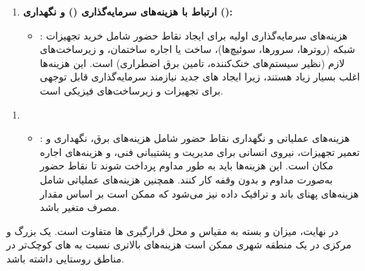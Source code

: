\begin{enumerate}
\begin{qsolve}
\begin{enumerate}
			\item 
			\textbf{ارتباط  با هزینه‌های سرمایه‌گذاری () و نگهداری ():}
			\begin{itemize}
				\item 
				: هزینه‌های سرمایه‌گذاری اولیه برای ایجاد نقاط حضور شامل خرید تجهیزات شبکه (روترها، سرورها، سوئیچ‌ها)، ساخت یا اجاره ساختمان، و زیرساخت‌های لازم (نظیر سیستم‌های خنک‌کننده، تامین برق اضطراری) است. این هزینه‌ها اغلب بسیار زیاد هستند، زیرا ایجاد های جدید نیازمند سرمایه‌گذاری قابل توجهی برای تجهیزات و زیرساخت‌های فیزیکی است.
			\end{itemize}

		\end{enumerate}
	\end{qsolve}
	
	
	
	\begin{qsolve}
		\begin{enumerate}
			\item [ ]
			\begin{itemize}
				\item 
				: هزینه‌های عملیاتی و نگهداری نقاط حضور شامل هزینه‌های برق، نگهداری و تعمیر تجهیزات، نیروی انسانی برای مدیریت و پشتیبانی فنی، و هزینه‌های اجاره مکان است. این هزینه‌ها باید به طور مداوم پرداخت شوند تا نقاط حضور به‌صورت مداوم و بدون وقفه کار کنند. همچنین هزینه‌های عملیاتی شامل هزینه‌های پهنای باند و ترافیک داده نیز می‌شود که ممکن است بر اساس مقدار مصرف متغیر باشد.
			\end{itemize}
			
		\end{enumerate}
		
		در نهایت، میزان  و  بسته به مقیاس و محل قرارگیری ها متفاوت است. یک  بزرگ و مرکزی در یک منطقه شهری ممکن است هزینه‌های بالاتری نسبت به های کوچک‌تر در مناطق روستایی داشته باشد.
	\end{qsolve}
	
\end{enumerate}